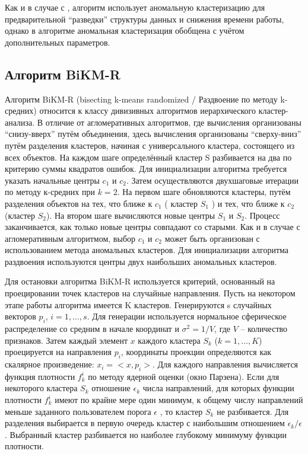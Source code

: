 \documentclass[12pt,tikz]{instruction}
\begin{document}
Как и в случае с \AWard, алгоритм \AWardpb использует аномальную кластеризацию для предварительной ``разведки'' структуры данных и снижения времени работы, однако в алгоритме \AWardpb аномальная кластеризация обобщена с учётом дополнительных параметров.

\subsection{Алгоритм BiKM-R} 
Алгоритм BiKM-R (bisecting k-means randomized / Раздвоение по методу k-средних) относится к классу дивизивных алгоритмов иерархического кластер-анализа. В отличие от агломеративных алгоритмов, где вычисления организованы ``снизу-вверх'' путём объединения, здесь вычисления организованы ``сверху-вниз'' путём разделения кластеров, начиная с универсального кластера, состоящего из всех объектов. На каждом шаге определённый кластер S разбивается на два по критерию  суммы квадратов ошибок. Для инициализации алгоритма требуется указать начальные центры $c_1$ и $c_2$. Затем осуществляются двухшаговые итерации по методу к-средних при $ k=2 $. На первом шаге обновляются кластеры, путём разделения объектов на тех, что ближе к $c_1$ ( кластер $ S_1 $ ) и тех, что ближе к $c_2$ (кластер $ S_2$). На втором шаге вычисляются новые центры $ S_1 $ и $ S_2 $. Процесс заканчивается, как только новые центры совпадают со старыми. Как и в случае с агломеративным алгоритмом, выбор $c_1$ и $c_2$ может быть организован с использованием метода аномальных кластеров. Для инициализации алгоритма раздвоения используются центры двух наибольших аномальных кластеров.

Для остановки алгоритма BiKM-R используется критерий, основанный на проецировании точек 
кластеров на случайные направления. Пусть на некотором этапе работы алгоритма имеется K кластеров. Генерируются s случайных векторов $p_i$, $i=1,\ldots,s$. Для генерации используется нормальное 
сферическое распределение со средним в начале координат и $\sigma^2=1/V$, где $V$ – количество признаков. 
Затем каждый элемент $x$ каждого кластера $S_k$ ($k=1,\ldots, K$) проецируется на направления $p_i$, 
координаты проекции определяются как скалярное произведение: $x_i=<x,p_i>$. Для каждого направления 
вычисляется функция плотности $f_k^i$ по методу ядерной оценки (окно Парзена). Если для некоторого кластера $S_k$ отношение $\epsilon_k$ числа направлений, для которых функции плотности  $f_k^i$ имеют по крайне мере один минимум, к общему числу направлений меньше заданного пользователем порога $\epsilon$ , то кластер $S_k$ не разбивается. Для разделения выбирается в первую очередь кластер с наибольшим отношением $\epsilon_k / \epsilon$. Выбранный кластер разбивается но наиболее глубокому минимуму функции плотности.  
\end{document}
